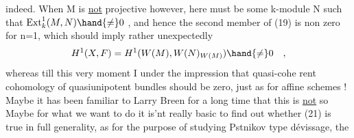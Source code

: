 indeed.  When M is \uline{not} projective however,  here must be some k-module
N such that  $\mathrm{Ext}^{1}_{k}(M,N) \hand{\neq} 0$ ,  and hence the second member of (19) is
non zero for n=1,  which should imply rather unexpectedly
\[ H^{1}(X,F) = H^{1}(W(M), W(N)_{W(M)}) \hand{\neq} 0 \quad , \]
whereas till this very moment I   under the impression that quasi-cohe%
rent cohomology of quasiunipotent bundles should be zero,  just as
for affine schemes !  Maybe it has been familiar to Larry Breen for a
long time that this is \uline{not} so  Maybe  for what we want to do it is'nt
really basic to find out whether (21) is true in full generality,  as
for the purpose of studying Pstnikov type dévissage,  the 


